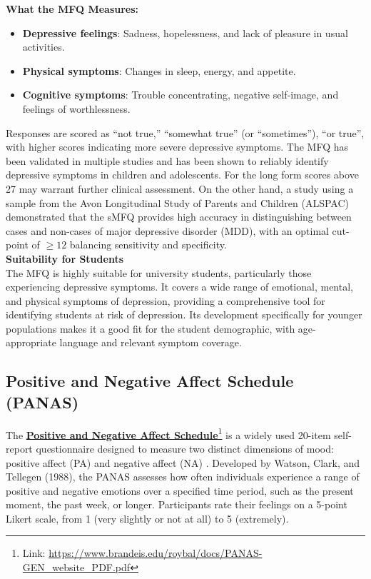 \noindent \textbf{What the MFQ Measures:}
\begin{itemize} 
    \item \textbf{Depressive feelings}: Sadness, hopelessness, and lack of pleasure in usual activities.
    \item \textbf{Physical symptoms}: Changes in sleep, energy, and appetite.
    \item \textbf{Cognitive symptoms}: Trouble concentrating, negative self-image, and feelings of worthlessness.
\end{itemize}
Responses are scored as ``not true,'' ``somewhat true'' (or ``sometimes''), ``or true'', with higher scores indicating more severe depressive symptoms. The MFQ has been validated in multiple studies and has been shown to reliably identify depressive symptoms in children and adolescents. For the long form scores above 27 may warrant further clinical assessment. On the other hand, a study using a sample from the Avon Longitudinal Study of Parents and Children (ALSPAC) \cite{mfq-short-review} demonstrated that the sMFQ provides high accuracy in distinguishing between cases and non-cases of major depressive disorder (MDD), with an optimal cut-point of $\geq 12$ balancing sensitivity and specificity. \vspace{5mm} \\
\noindent \textbf{Suitability for Students} \\
The MFQ is highly suitable for university students, particularly those experiencing depressive symptoms. It covers a wide range of emotional, mental, and physical symptoms of depression, providing a comprehensive tool for identifying students at risk of depression. Its development specifically for younger populations makes it a good fit for the student demographic, with age-appropriate language and relevant symptom coverage.

\subsection{Positive and Negative Affect Schedule (PANAS)}

The \textbf{\href{https://www.brandeis.edu/roybal/docs/PANAS-GEN_website_PDF.pdf}{Positive and Negative Affect Schedule}}\footnote{Link: \url{https://www.brandeis.edu/roybal/docs/PANAS-GEN_website_PDF.pdf}} is a widely used 20-item self-report questionnaire designed to measure two distinct dimensions of mood: positive affect (PA) and negative affect (NA) \cite{panas-review}. Developed by Watson, Clark, and Tellegen (1988), the PANAS assesses how often individuals experience a range of positive and negative emotions over a specified time period, such as the present moment, the past week, or longer. Participants rate their feelings on a 5-point Likert scale, from 1 (very slightly or not at all) to 5 (extremely).\vspace{5mm}


